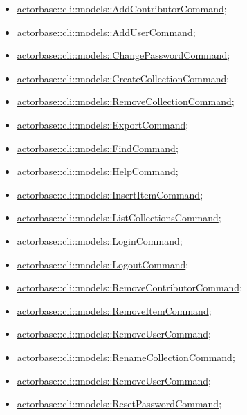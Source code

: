 \documentclass{scalatekids-article}
\begin{document}
\begin{itemize}
\item \hyperref[sec:actorbase::cli::models::AddContributorCommand]{actorbase::cli::models::AddContributorCommand};
\item \hyperref[sec:actorbase::cli::models::AddUserCommand]{actorbase::cli::models::AddUserCommand};
\item \hyperref[sec:actorbase::cli::models::ChangePasswordCommand]{actorbase::cli::models::ChangePasswordCommand};
\item \hyperref[sec:actorbase::cli::models::CreateCollectionCommand]{actorbase::cli::models::CreateCollectionCommand};
\item \hyperref[sec:actorbase::cli::models::RemoveCollectionCommand]{actorbase::cli::models::RemoveCollectionCommand};
\item \hyperref[sec:actorbase::cli::models::ExportCommand]{actorbase::cli::models::ExportCommand};
\item \hyperref[sec:actorbase::cli::models::FindCommand]{actorbase::cli::models::FindCommand};
\item \hyperref[sec:actorbase::cli::models::HelpCommand]{actorbase::cli::models::HelpCommand};
\item \hyperref[sec:actorbase::cli::models::InsertItemCommand]{actorbase::cli::models::InsertItemCommand};
\item \hyperref[sec:actorbase::cli::models::ListCollectionsCommand]{actorbase::cli::models::ListCollectionsCommand};
\item \hyperref[sec:actorbase::cli::models::LoginCommand]{actorbase::cli::models::LoginCommand};
\item \hyperref[sec:actorbase::cli::models::LogoutCommand]{actorbase::cli::models::LogoutCommand};
\item \hyperref[sec:actorbase::cli::models::RemoveContributorCommand]{actorbase::cli::models::RemoveContributorCommand};
\item \hyperref[sec:actorbase::cli::models::RemoveItemCommand]{actorbase::cli::models::RemoveItemCommand};
\item \hyperref[sec:actorbase::cli::models::RemoveUserCommand]{actorbase::cli::models::RemoveUserCommand};
\item \hyperref[sec:actorbase::cli::models::RenameCollectionCommand]{actorbase::cli::models::RenameCollectionCommand};
\item \hyperref[sec:actorbase::cli::models::RemoveUserCommand]{actorbase::cli::models::RemoveUserCommand};
\item \hyperref[sec:actorbase::cli::models::ResetPasswordCommand]{actorbase::cli::models::ResetPasswordCommand};
\end{itemize}
\end{document}
